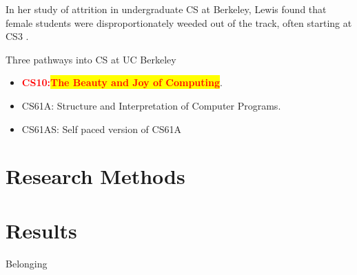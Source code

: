 \documentclass{beamer}                  %
\newcommand{\hilight}[1]{\colorbox{yellow}{#1}}
\begin{document}
        \begin{frame}{}
        In her study of attrition in undergraduate CS at Berkeley, Lewis found that female students were disproportionately weeded out of the track, often starting at CS3 \cite{Lewis:EECS-2010-132}.
        \end{frame}

        \begin{frame}{}
        Three pathways into CS at UC Berkeley
            \begin{itemize}
                 \item \textcolor{red}{\textbf{CS10:\hilight{The Beauty and Joy of Computing}}}.
                 \item CS61A: Structure and Interpretation of Computer Programs.
                \item CS61AS: Self paced version of CS61A
            \end{itemize}
        \end{frame}


\section{Research Methods}
\begin{frame}{}

  \begin{figure}[!htbp]
      \centering
      
  \end{figure}

\end{frame}

\section{Results}
\begin{frame}{Belonging}

\end{frame}

    

        

\printbibliography

\clearpage
\end{document}
